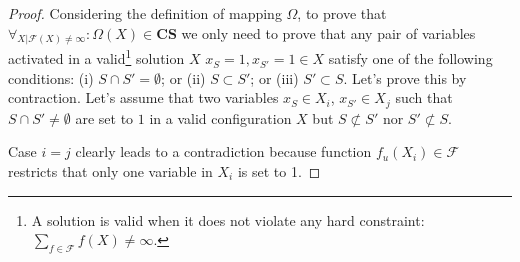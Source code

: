 \documentclass{aamas2012}
\begin{document}
\begin{proof}
Considering the definition of mapping $\Omega$, to prove that $\forall_{X\vert
\mathcal{F}(X) \neq \infty }:\Omega(X) \in \mathbf{CS}$ we only need to prove
that any pair of variables activated in a valid\footnote{A solution is valid when it does not violate any hard constraint:
$\sum_{f\in\mathcal{F} } f(X)\neq \infty$.} solution $X$ $x_S=1, x_{S'}=1 \in X$ satisfy one of the following
conditions: (i) $S \cap S' = \emptyset$; or (ii) $S \subset S'$; or (iii) $S' \subset S$.
Let's prove this by contraction. Let's assume that two variables
$x_S\in X_i$, $x_{S'}\in X_j$ such that $S\cap S'\neq \emptyset$ are set to $1$
in a valid configuration $X$ but $S \not\subset S'$ nor $S' \not\subset S$.


Case $i = j$ clearly leads to a contradiction because function $f_u(X_i)\in
\mathcal{F}$ restricts that only one variable in $X_i$ is set to 1.



\end{proof}
\end{document}
